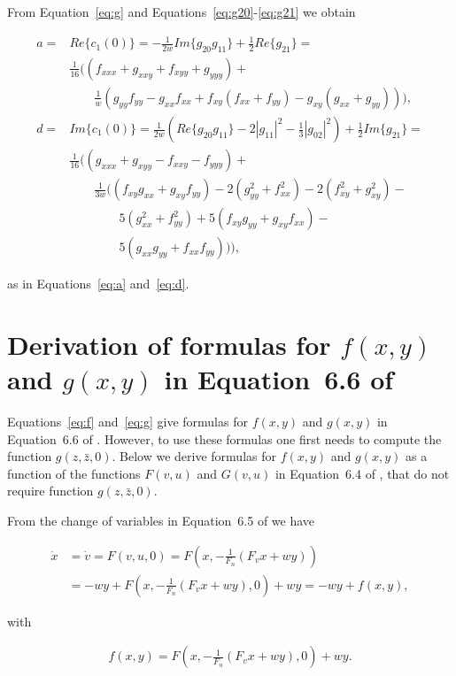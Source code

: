 \documentclass{article}
\theoremstyle{lemma}
\begin{document}
From Equation~\ref{eq:g} and Equations~\ref{eq:g20}-\ref{eq:g21} we obtain

\begin{align}
a=&Re\{c_1(0)\}=-\frac{1}{2w}Im\{g_{20}g_{11}\}+\frac{1}{2}Re\{g_{21}\}=\nonumber\\
&\frac{1}{16}((f_{xxx}+g_{xxy}+f_{xyy}+g_{yyy})+\nonumber\\
&\qquad\frac{1}{w}(g_{yy}f_{yy}-g_{xx}f_{xx}+f_{xy}(f_{xx}+f_{yy})-g_{xy}(g_{xx}+g_{yy}))),\nonumber\\
d=&Im\{c_1(0)\}=\frac{1}{2w}(Re\{g_{20}g_{11}\}-2|g_{11}|^2-\frac{1}{3}|g_{02}|^2)+\frac{1}{2}Im\{g_{21}\}=\nonumber\\
&\frac{1}{16}((g_{xxx}+g_{xyy}-f_{xxy}-f_{yyy})+\nonumber\\
&\qquad\frac{1}{3w}((f_{xy}g_{xx}+g_{xy}f_{yy})-2(g_{yy}^2+f_{xx}^2)-2(f_{xy}^2+g_{xy}^2)-\nonumber\\
&\qquad\qquad5(g_{xx}^2+f_{yy}^2)+5(f_{xy}g_{yy}+g_{xy}f_{xx})-\nonumber\\
&\qquad\qquad5(g_{xx}g_{yy}+f_{xx}f_{yy})))\nonumber,
\end{align}

\noindent as in Equations~\ref{eq:a} and~\ref{eq:d}.

\section{Derivation of formulas for $f(x,y)$ and $g(x,y)$ in Equation~6.6 of
\citet{izhikevich07}}
\label{sec:derivationFormulas_fg}

Equations~\ref{eq:f} and~\ref{eq:g} give formulas for $f(x,y)$ and $g(x,y)$ in
Equation~6.6 of \citet{izhikevich07}. However, to use these formulas one
first needs to compute the function $g(z,\bar{z},0)$. Below we derive formulas
for $f(x,y)$ and $g(x,y)$ as a function of the functions $F(v,u)$ and $G(v,u)$
in Equation~6.4 of \citet{izhikevich07}, that do not require function
$g(z,\bar{z},0)$.

From the change of variables in Equation~6.5 of \citet{izhikevich07} we have

\begin{align}
\dot{x}&=\dot{v}=F(v,u,0)=F(x, -\frac{1}{F_n}(F_vx+wy))\nonumber\\
&=-wy+F(x,-\frac{1}{F_n}(F_v x+wy),0)+wy=-wy+f(x,y),\nonumber
\end{align}

\noindent with

\begin{align}
f(x,y)=F(x,-\frac{1}{F_n}(F_v x+wy),0)+wy.
\label{eq:fRewritten}
\end{align}
\end{document}
